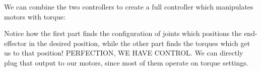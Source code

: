 \documentclass{article}
\begin{document}
{        \begin{center}
        \end{center}


        We can combine the two controllers to create a full controller which manipulates motors with torque:
    
        \begin{center}
        \end{center}

        Notice how the first part finds the configuration of joints which positions the end-effector in the desired position, while the other part finds the torques which get us to that position!
        PERFECTION, WE HAVE CONTROL. We can directly plug that output to our motors, since most of them operate on torque settings.
    }
\end{document}
